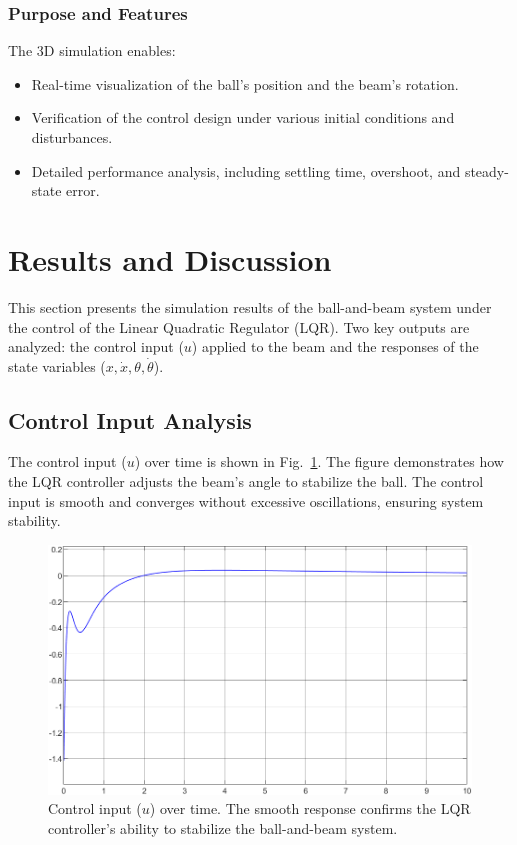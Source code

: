 \documentclass[conference]{IEEEtran}
\begin{document}
\subsubsection{Purpose and Features}
The 3D simulation enables:
\begin{itemize}
    \item Real-time visualization of the ball's position and the beam's rotation.
    \item Verification of the control design under various initial conditions and disturbances.
    \item Detailed performance analysis, including settling time, overshoot, and steady-state error.
\end{itemize}

\section{Results and Discussion}
\label{sec:results}

This section presents the simulation results of the ball-and-beam system under the control of the Linear Quadratic Regulator (LQR). Two key outputs are analyzed: the control input (\(u\)) applied to the beam and the responses of the state variables (\(x, \dot{x}, \theta, \dot{\theta}\)).

\subsection{Control Input Analysis}
The control input (\(u\)) over time is shown in Fig.~\ref{fig:control_input_scope}. The figure demonstrates how the LQR controller adjusts the beam's angle to stabilize the ball. The control input is smooth and converges without excessive oscillations, ensuring system stability.

\begin{figure}[htbp]
    \centering
    \includegraphics[width=\linewidth]{figures/control_input_scope.png}
    \caption[]{Control input (\(u\)) over time. The smooth response confirms the LQR controller's ability to stabilize the ball-and-beam system.}
    \label{fig:control_input_scope}
\end{figure}
\end{document}
